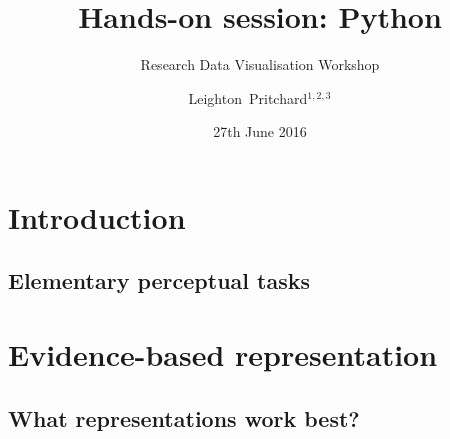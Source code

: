 

%



\title[RDVW: Python] %
{Hands-on session: Python}
\subtitle{Research Data Visualisation Workshop}
\author[Pritchard] %
{Leighton~Pritchard$^{1,2,3}$}
\date[27th June 2016] %
{27th June 2016}
\subject{Data Science, Data Analysis, Data Visualisation, Research Data Visualisation, Python, Programming}





\frame[plain]{\titlepage}



\section{Introduction}
\subsection{Elementary perceptual tasks}


\section{Evidence-based representation}
\subsection{What representations work best?}

